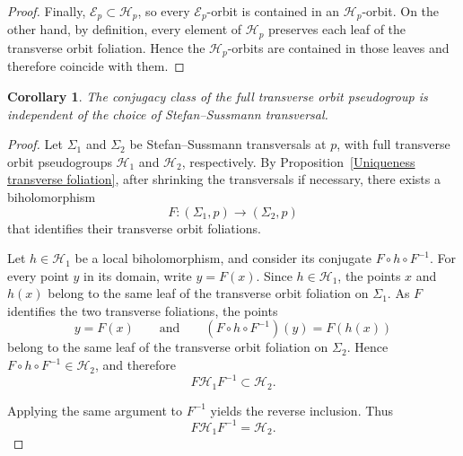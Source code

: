 \documentclass[11pt]{amsart}
\newtheorem{corollary}[theorem]{Corollary}
\theoremstyle{definition}
\theoremstyle{remark}
\begin{document}
\begin{proof}
Finally, $\mathcal E_p\subset\mathcal H_p$, so every
$\mathcal E_p$-orbit is contained in an $\mathcal H_p$-orbit. On the
other hand, by definition, every element of $\mathcal H_p$ preserves
each leaf of the transverse orbit foliation. Hence the
$\mathcal H_p$-orbits are contained in those leaves and therefore
coincide with them.

\end{proof}


\begin{corollary}
The conjugacy class of the full transverse orbit pseudogroup is
independent of the choice of Stefan--Sussmann transversal.
\end{corollary}


 
\begin{proof}
Let $\Sigma_1$ and $\Sigma_2$ be Stefan--Sussmann transversals at $p$,
with full transverse orbit pseudogroups $\mathcal H_1$ and
$\mathcal H_2$, respectively. By
Proposition~\ref{Uniqueness transverse foliation}, after shrinking the
transversals if necessary, there exists a biholomorphism
\[
    F:(\Sigma_1,p)\longrightarrow(\Sigma_2,p)
\]
that identifies their transverse orbit foliations.

Let $h\in\mathcal H_1$ be a local biholomorphism, and consider its
conjugate $F\circ h\circ F^{-1}$. For every point $y$ in its domain,
write $y=F(x)$. Since $h\in\mathcal H_1$, the points $x$ and $h(x)$
belong to the same leaf of the transverse orbit foliation on
$\Sigma_1$. As $F$ identifies the two transverse foliations, the points
\[
    y=F(x)
    \qquad\text{and}\qquad
    (F\circ h\circ F^{-1})(y)=F(h(x))
\]
belong to the same leaf of the transverse orbit foliation on
$\Sigma_2$. Hence
$F\circ h\circ F^{-1}\in\mathcal H_2$, and therefore
\[
    F\mathcal H_1F^{-1}\subset\mathcal H_2.
\]

Applying the same argument to $F^{-1}$ yields the reverse inclusion.
Thus
\[
    F\mathcal H_1F^{-1}=\mathcal H_2.
\]
\end{proof}
 
\end{document}
